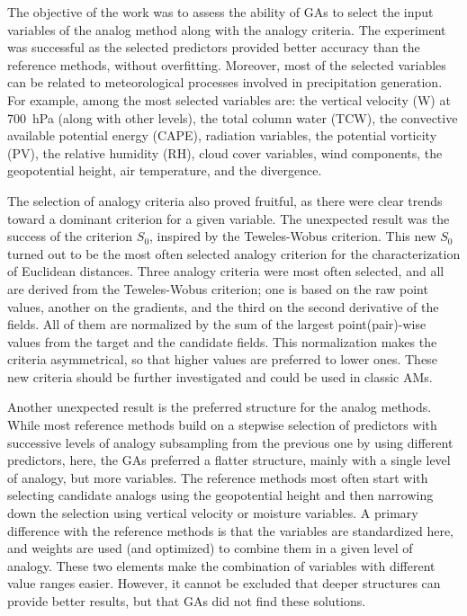 \documentclass[draft]{agujournal2019}
\begin{document}
The objective of the work was to assess the ability of GAs to select the input variables of the analog method along with the analogy criteria. The experiment was successful as the selected predictors provided better accuracy than the reference methods, without overfitting. Moreover, most of the selected variables can be related to meteorological processes involved in precipitation generation. For example, among the most selected variables are: the vertical velocity (W) at 700~hPa (along with other levels), the total column water (TCW), the convective available potential energy (CAPE), radiation variables, the potential vorticity (PV), the relative humidity (RH), cloud cover variables, wind components, the geopotential height, air temperature, and the divergence.

The selection of analogy criteria also proved fruitful, as there were clear trends toward a dominant criterion for a given variable. The unexpected result was the success of the criterion $S_{0}$, inspired by the Teweles-Wobus criterion. This new $S_{0}$ turned out to be the most often selected analogy criterion for the characterization of Euclidean distances. Three analogy criteria were most often selected, and all are derived from the Teweles-Wobus criterion; one is based on the raw point values, another on the gradients, and the third on the second derivative of the fields. All of them are normalized by the sum of the largest point(pair)-wise values from the target and the candidate fields. This normalization makes the criteria asymmetrical, so that higher values are preferred to lower ones. These new criteria should be further investigated and could be used in classic AMs.

Another unexpected result is the preferred structure for the analog methods. While most reference methods build on a stepwise selection of predictors with successive levels of analogy subsampling from the previous one by using different predictors, here, the GAs preferred a flatter structure, mainly with a single level of analogy, but more variables. The reference methods most often start with selecting candidate analogs using the geopotential height and then narrowing down the selection using vertical velocity or moisture variables. A primary difference with the reference methods is that the variables are standardized here, and weights are used (and optimized) to combine them in a given level of analogy. These two elements make the combination of variables with different value ranges easier. However, it cannot be excluded that deeper structures can provide better results, but that GAs did not find these solutions.
\end{document}
